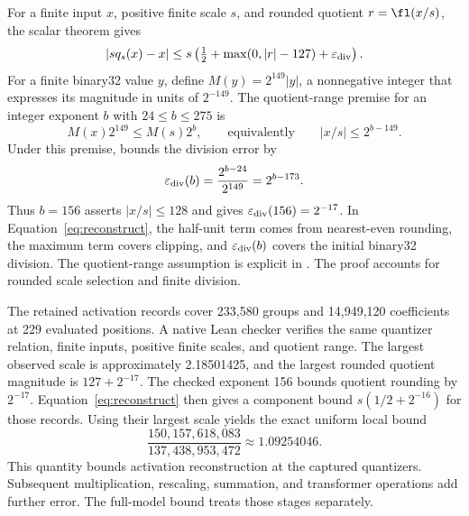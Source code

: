 For a finite input $x$, positive finite scale $s$, and rounded quotient $r=\fl(x/s)$, the scalar theorem gives
\begin{equation}
 |s q_s(x)-x|
 \leq s\left(\tfrac12+\max(0,|r|-127)+\varepsilon_{\rm div}\right).
 \label{eq:reconstruct}
\end{equation}
For a finite binary32 value $y$, define $M(y)=2^{149}|y|$, a nonnegative integer that expresses its magnitude in units of $2^{-149}$.  The quotient-range premise for an integer exponent $b$ with $24\leq b\leq275$ is
\begin{equation}
 M(x)2^{149}\leq M(s)2^b,
 \qquad\text{equivalently}\qquad |x/s|\leq2^{b-149}.
 \label{eq:divisionrange}
\end{equation}
Under this premise,  bounds the division error by
\begin{equation}
 \varepsilon_{\rm div}(b)=\frac{2^{b-24}}{2^{149}}=2^{b-173}.
 \label{eq:divisionepsilon}
\end{equation}
Thus $b=156$ asserts $|x/s|\leq128$ and gives $\varepsilon_{\rm div}(156)=2^{-17}$.  In Equation~\eqref{eq:reconstruct}, the half-unit term comes from nearest-even rounding, the maximum term covers clipping, and $\varepsilon_{\rm div}(b)$ covers the initial binary32 division.  The quotient-range assumption is explicit in .  The proof accounts for rounded scale selection and finite division.

The retained activation records cover 233,580 groups and 14,949,120 coefficients at 229 evaluated positions.  A native Lean checker verifies the same quantizer relation, finite inputs, positive finite scales, and quotient range.  The largest observed scale is approximately 2.18501425, and the largest rounded quotient magnitude is $127+2^{-17}$.  The checked exponent 156 bounds quotient rounding by $2^{-17}$.  Equation~\eqref{eq:reconstruct} then gives a component bound $s(1/2+2^{-16})$ for those records.  Using their largest scale yields the exact uniform local bound
\[
 \frac{150{,}157{,}618{,}083}{137{,}438{,}953{,}472}
 \approx1.09254046.
\]
This quantity bounds activation reconstruction at the captured quantizers.  Subsequent multiplication, rescaling, summation, and transformer operations add further error.  The full-model bound treats those stages separately.
